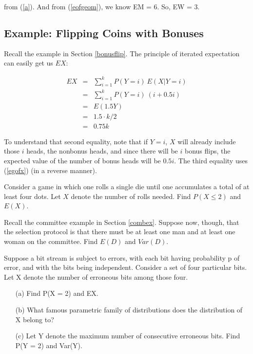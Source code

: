 from (\ref{a}).  And from (\ref{eofgeom}), we know EM = 6.  So, EW = 3.

\subsection{Example: Flipping Coins with Bonuses}

Recall the example in Section \ref{bonusflip}.  The principle of
iterated expectation can easily get us $EX$:

\begin{eqnarray}
EX &=& \sum_{i=1}^k P(Y = i) ~ E(X | Y = i) \\
   &=& \sum_{i=1}^k P(Y = i) ~ (i + 0.5i) \\
   &=& E(1.5Y) \\
   &=& 1.5 \cdot k/2 \\
   &=& 0.75k
\end{eqnarray}

To understand that second equality, note that if $Y = i$, $X$ will
already include those $i$ heads, the nonbonus heads, and since there
will be $i$ bonus flips, the expected value of the number of bonus heads
will be $0.5 i$.  The third equality uses (\ref{egofx}) (in a reverse
manner).

\startproblemset

\oneproblem
Consider a game in which one rolls a single die until one accumulates a
total of at least four dots. Let $X$ denote the number of rolls needed.
Find $P(X \leq 2)$ and $E(X)$.

\oneproblem
Recall the committee example in Section \ref{combex}.  Suppose now,
though, that the selection protocol is that there must be at least one
man and at least one woman on the committee.  Find $E(D)$ and $Var(D)$.

\oneproblem
Suppose a bit stream is subject to errors, with each bit having
probability p of error, and with the bits being independent. Consider a
set of four particular bits. Let X denote the number of erroneous bits
among those four.

\begin{itemize}

\item [(a)] Find P(X = 2) and EX.

\item [(b)] What famous parametric family of distributions does the
distribution of X belong to?

\item [(c)] Let Y denote the maximum number of consecutive erroneous bits.
Find P(Y = 2) and Var(Y). 

\end{itemize}

